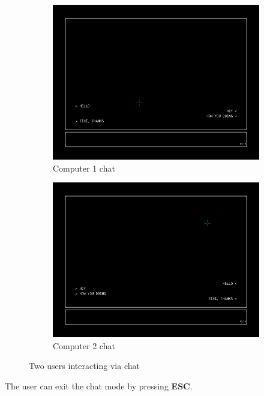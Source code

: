 \documentclass{article}
\theoremstyle{remark}
\begin{document}
\begin{figure}[H] \centering
	\begin{subfigure}[b]{0.48\linewidth}
		\includegraphics[width=\linewidth]{chat02_01}
		\caption{Computer 1 chat}
	\end{subfigure}
	\begin{subfigure}[b]{0.48\linewidth}
		\includegraphics[width=\linewidth]{chat02_02}
		\caption{Computer 2 chat}
	\end{subfigure}
	\caption{Two users interacting via chat}
\end{figure}
The user can exit the chat mode by pressing \textbf{ESC}.
\end{document}
